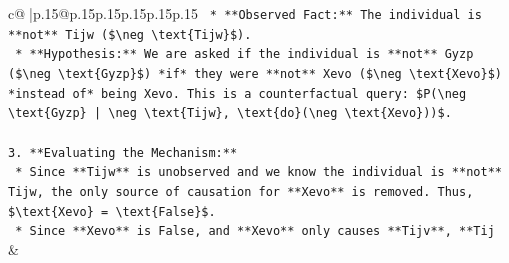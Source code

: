 \documentclass{article}
\begin{document}
{\begin{supertabular}{c@{$\;$}|p{.15\linewidth}@{}p{.15\linewidth}p{.15\linewidth}p{.15\linewidth}p{.15\linewidth}p{.15\linewidth}}
{{{\texttt{    *   **Observed Fact:** The individual is **not** Tijw (\$\textbackslash{}neg \textbackslash{}text\{Tijw\}\$).} \\
\texttt{    *   **Hypothesis:** We are asked if the individual is **not** Gyzp (\$\textbackslash{}neg \textbackslash{}text\{Gyzp\}\$) *if* they were **not** Xevo (\$\textbackslash{}neg \textbackslash{}text\{Xevo\}\$) *instead of* being Xevo. This is a counterfactual query: \$P(\textbackslash{}neg \textbackslash{}text\{Gyzp\} | \textbackslash{}neg \textbackslash{}text\{Tijw\}, \textbackslash{}text\{do\}(\textbackslash{}neg \textbackslash{}text\{Xevo\}))\$.} \\
\\ 
\texttt{3.  **Evaluating the Mechanism:**} \\
\texttt{    *   Since **Tijw** is unobserved and we know the individual is **not** Tijw, the only source of causation for **Xevo** is removed. Thus, \$\textbackslash{}text\{Xevo\} = \textbackslash{}text\{False\}\$.} \\
\texttt{    *   Since **Xevo** is False, and **Xevo** only causes **Tijv**, **Tij} \\
            }
        }
    }
    & \\ \\


\end{supertabular}}
\end{document}

